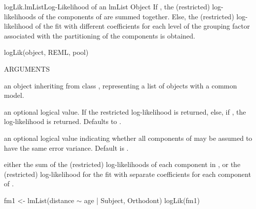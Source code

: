 \documentclass[pdftex]{article} \usepackage{url,graphicx}
\renewcommand{\Twiddle}{\mbox{\(\sim\)}}
\begin{document}
\begin{Helpfile}{logLik.lmList}{Log-Likelihood of an lmList Object}
If , the (restricted) log-likelihoods of the 
components of  are summed together. Else, the (restricted)
log-likelihood of the  fit with different coefficients for
each level of the grouping factor associated with the partitioning of
the  components is obtained.
\begin{Example}
logLik(object, REML, pool)
\end{Example}
\begin{Argument}{ARGUMENTS}
\item[\Co{object:}]
an object inheriting from class , representing
a list of  objects with a common model.
\item[\Co{REML:}]
an optional logical value. If  the restricted
log-likelihood is returned, else, if , the log-likelihood
is returned. Defaults to .
\item[\Co{pool:}]
an optional logical value indicating whether all 
components of  may be assumed to have the same error
variance. Default is .
\end{Argument}
either the sum of the (restricted) log-likelihoods of each 
component in , or the (restricted) log-likelihood for the
 fit with separate coefficients for each component of
.
\need 15pt
\vspace{-16pt}
\begin{Example}
fm1 <- lmList(distance {\Twiddle} age | Subject, Orthodont)
logLik(fm1)
\end{Example}
\end{Helpfile}
\end{document}
